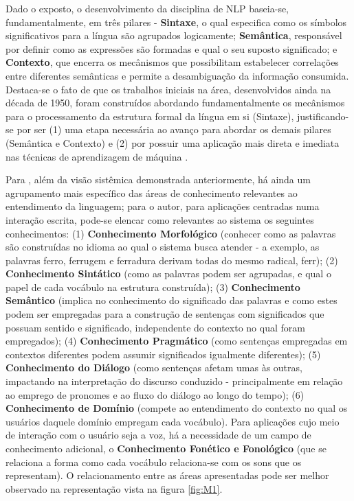 Dado o exposto, o desenvolvimento da disciplina de NLP baseia-se, fundamentalmente, em três pilares - \textbf{Sintaxe}, o qual especifica como os símbolos significativos para a língua são agrupados logicamente; \textbf{Semântica}, responsável por definir como as expressões são formadas e qual o seu suposto significado; e \textbf{Contexto}, que encerra os mecânismos que possibilitam estabelecer correlações entre diferentes semânticas e permite a desambiguação da informação consumida. Destaca-se o fato de que os trabalhos iniciais na área, desenvolvidos ainda na década de 1950, foram construídos abordando fundamentalmente os mecânismos para o processamento da estrutura formal da língua em si (Sintaxe), justificando-se por ser (1) uma etapa necessária ao avanço para abordar os demais pilares (Semântica e Contexto) e (2) por possuir uma aplicação mais direta e imediata nas técnicas de aprendizagem de máquina \cite{cambria2014jumping}.



Para , além da visão sistêmica demonstrada anteriormente, há ainda um agrupamento mais específico das áreas de conhecimento relevantes ao entendimento da linguagem; para o autor, para aplicações centradas numa interação escrita, pode-se elencar como relevantes ao sistema os seguintes conhecimentos: (1) \textbf{Conhecimento Morfológico} (conhecer como as palavras são construídas no idioma ao qual o sistema busca atender - a exemplo, as palavras ferro, ferrugem e ferradura derivam todas do mesmo radical, ferr); (2) \textbf{Conhecimento Sintático} (como as palavras podem ser agrupadas, e qual o papel de cada vocábulo na estrutura construída); (3) \textbf{Conhecimento Semântico} (implica no conhecimento do significado das palavras e como estes podem ser empregadas para a construção de sentenças com significados que possuam sentido e significado, independente do contexto no qual foram empregados); (4) \textbf{Conhecimento Pragmático} (como sentenças empregadas em contextos diferentes podem assumir significados igualmente diferentes); (5) \textbf{Conhecimento do Diálogo} (como sentenças afetam umas às outras, impactando na interpretação do discurso conduzido - principalmente em relação ao emprego de pronomes e ao fluxo do diálogo ao longo do tempo); (6) \textbf{Conhecimento de Domínio} (compete ao entendimento do contexto no qual os usuários daquele domínio empregam cada vocábulo). Para aplicações cujo meio de interação com o usuário seja a voz, há a necessidade de um campo de conhecimento adicional, o \textbf{Conhecimento Fonético e Fonológico} (que se relaciona a forma como cada vocábulo relaciona-se com os sons que os representam). O relacionamento entre as áreas apresentadas pode ser melhor observado na representação vista na figura \ref{fig:M1}.

